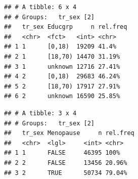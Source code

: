 \documentclass[]{article}
\newenvironment{Shaded}{\begin{snugshade}}{\end{snugshade}}
\newcommand{\DataTypeTok}[1]{\textcolor[rgb]{0.13,0.29,0.53}{#1}}
\newcommand{\DecValTok}[1]{\textcolor[rgb]{0.00,0.00,0.81}{#1}}
\newcommand{\KeywordTok}[1]{\textcolor[rgb]{0.13,0.29,0.53}{\textbf{#1}}}
\newcommand{\NormalTok}[1]{#1}
\newcommand{\OperatorTok}[1]{\textcolor[rgb]{0.81,0.36,0.00}{\textbf{#1}}}
\newcommand{\OtherTok}[1]{\textcolor[rgb]{0.56,0.35,0.01}{#1}}
\newcommand{\StringTok}[1]{\textcolor[rgb]{0.31,0.60,0.02}{#1}}
\begin{document}
\begin{verbatim}
## # A tibble: 6 x 4
## # Groups:   tr_sex [2]
##   tr_sex Educgrp     n rel.freq
##   <chr>  <fct>   <int> <chr>   
## 1 1      [0,18)  19209 41.4%   
## 2 1      [18,70) 14470 31.19%  
## 3 1      unknown 12716 27.41%  
## 4 2      [0,18)  29683 46.24%  
## 5 2      [18,70) 17917 27.91%  
## 6 2      unknown 16590 25.85%
\end{verbatim}

\begin{Shaded}
\end{Shaded}

\begin{verbatim}
## # A tibble: 3 x 4
## # Groups:   tr_sex [2]
##   tr_sex Menopause     n rel.freq
##   <chr>  <lgl>     <int> <chr>   
## 1 1      FALSE     46395 100%    
## 2 2      FALSE     13456 20.96%  
## 3 2      TRUE      50734 79.04%
\end{verbatim}
\end{document}

